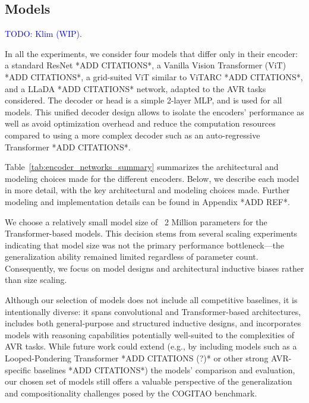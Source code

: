 \subsection{Models}
\label{subsec:models}
\textcolor{blue}{TODO: Klim (WIP)}.



In all the experiments, we consider four models that differ only in their encoder: a standard ResNet *ADD CITATIONS*, a Vanilla Vision Transformer (ViT) *ADD CITATIONS*, a grid-suited ViT similar to ViTARC *ADD CITATIONS*, and a LLaDA *ADD CITATIONS* network, adapted to the AVR tasks considered. The decoder or head is a simple 2-layer MLP, and is used for all models. This unified decoder design allows to isolate the encoders’ performance as well as avoid optimization overhead and reduce the computation resources compared to using a more complex decoder such as an auto-regressive Transformer *ADD CITATIONS*.

Table~\ref{tab:encoder_networks_summary} summarizes the architectural and modeling choices made for the different encoders. Below, we describe each model in more detail, with the key architectural and modeling choices made. Further modeling and implementation details can be found in Appendix *ADD REF*.

We choose a relatively small model size of ~2 Million parameters for the Transformer-based models. This decision stems from several scaling experiments indicating that model size was not the primary performance bottleneck---the generalization ability remained limited regardless of parameter count. Consequently, we focus on model designs and architectural inductive biases rather than size scaling.

Although our selection of models does not include all competitive baselines, it is intentionally diverse: it spans convolutional and Transformer-based architectures, includes both general-purpose and structured inductive designs, and incorporates models with reasoning capabilities potentially well-suited to the complexities of AVR tasks. While future work could extend (e.g., by including models such as a Looped-Pondering Transformer *ADD CITATIONS (?)* or other strong AVR-specific baselines *ADD CITATIONS*) the models' comparison and evaluation, our chosen set of models still offers a valuable perspective of the generalization and compositionality challenges posed by the COGITAO benchmark.

